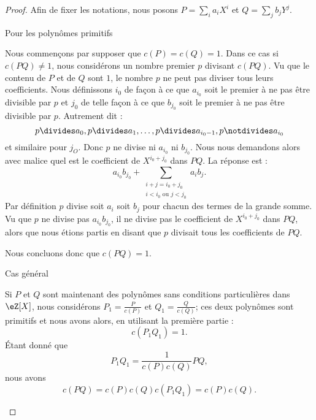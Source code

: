 \begin{proof}
    
    Afin de fixer les notations, nous posons \( P=\sum_ia_iX^i\) et \( Q=\sum_jb_jY^j\).
    
    \begin{subproof}
        \item[Pour les polynômes primitifs]
    
            Nous commençons par supposer que \( c(P)=c(Q)=1\). Dans ce cas si \( c(PQ)\neq 1\), nous considérons un nombre premier \( p\) divisant \( c(PQ)\). Vu que le contenu de \( P\) et de \( Q\) sont \( 1\), le nombre \( p\) ne peut pas diviser tous leurs coefficients. Nous définissons \( i_0\) de façon à ce que \( a_{i_0}\) soit le premier à ne pas être divisible par \( p\) et \( j_0\) de telle façon à ce que \( b_{j_0}\) soit le premier à ne pas être divisible par \( p\). Autrement dit :
            \begin{equation}
                p\divides a_0,p\divides a_1,\ldots,p\divides a_{i_0-1},p\notdivides a_{i_0}
            \end{equation}
            et similaire pour \( j_O\). Donc \( p\) ne divise ni \( a_{i_0}\) ni \( b_{j_0}\). Nous nous demandons alors avec malice quel est le coefficient de \( X^{i_0+j_0}\) dans \( PQ\). La réponse est :
            \begin{equation}
                a_{i_0}b_{j_0}+\sum_{\substack{i+j=i_0+j_0\\i<i_0\text{ ou }j<j_0}}a_ib_j.
            \end{equation}
            Par définition \( p\) divise soit \( a_i\) soit \( b_j\) pour chacun des termes de la grande somme. Vu que \( p\) ne divise pas \( a_{i_0}b_{j_0}\), il ne divise pas le coefficient de \( X^{i_0+j_0}\) dans \( PQ\), alors que nous étions partis en disant que \( p\) divisait tous les coefficients de \( PQ\).

            Nous concluons donc que \( c(PQ)=1\).

        \item[Cas général]

            Si \( P\) et \( Q\) sont maintenant des polynômes sans conditions particulières dans \( \eZ[X]\), nous considérons \( P_1=\frac{ P }{ c(P) }\) et \( Q_1=\frac{ Q }{ c(Q) }\); ces deux polynômes sont primitifs et nous avons alors, en utilisant la première partie :
            \begin{equation}
                c(P_1Q_1)=1.
            \end{equation}
            Étant donné que
            \begin{equation}
                P_1Q_1=\frac{1}{ c(P)c(Q) }PQ,
            \end{equation}
            nous avons
            \begin{equation}
                c(PQ)=c(P)c(Q)c(P_1Q_1)=c(P)c(Q).
            \end{equation}
    \end{subproof}
\end{proof}


